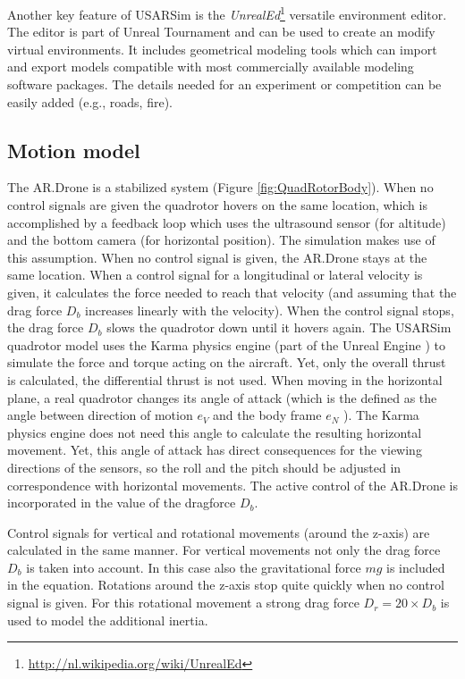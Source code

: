 Another key feature of USARSim is the \textit{UnrealEd}\footnote{\url{http://nl.wikipedia.org/wiki/UnrealEd}} versatile environment editor.
The editor is part of Unreal Tournament and can be used to create an modify virtual environments.
It includes geometrical modeling tools which can import and export models compatible with most commercially available modeling software packages.
The details needed for an experiment or competition can be easily added (e.g., roads, fire).



		\subsection{Motion model}
The AR.Drone is a stabilized system (Figure \ref{fig:QuadRotorBody}). When no control signals are given the quadrotor hovers on the same location, which is accomplished by a feedback loop which uses the ultrasound sensor (for altitude) and the bottom camera (for horizontal position). The simulation makes use of this assumption. When no control signal is given, the AR.Drone stays at the same location.
When a control signal for a longitudinal or lateral velocity is given, it calculates the force needed to reach that velocity (and assuming that the drag force $D_b$ increases linearly with the velocity). When the control signal stops, the drag force $D_b$ slows the quadrotor down until it hovers again.
The USARSim quadrotor model uses the Karma physics engine (part of the Unreal Engine \cite{Carpin2006}) to simulate the force and torque acting on the aircraft. Yet, only the overall thrust is calculated, the differential thrust is not used.
When moving in the horizontal plane, a real quadrotor changes its angle of attack (which is the defined as the angle between direction of motion $e_V$ and the body frame $e_N$ \cite{Yechout2003}). 
The Karma physics engine does not need this angle to calculate the resulting horizontal movement. Yet, this angle of attack has direct consequences for the viewing directions of the sensors, so the roll and the pitch should be adjusted in correspondence with horizontal movements. The active control of the AR.Drone is incorporated in the value of the dragforce $D_b$.

Control signals for vertical and rotational movements (around the z-axis) are calculated in the same manner. For vertical movements not only the drag force $D_b$ is taken into account. In this case also the gravitational force $mg$ is included in the equation. Rotations around the z-axis stop quite quickly when no control signal is given. For this rotational movement a strong drag force $D_r = 20 \times D_b$ is used to model the additional inertia. 


